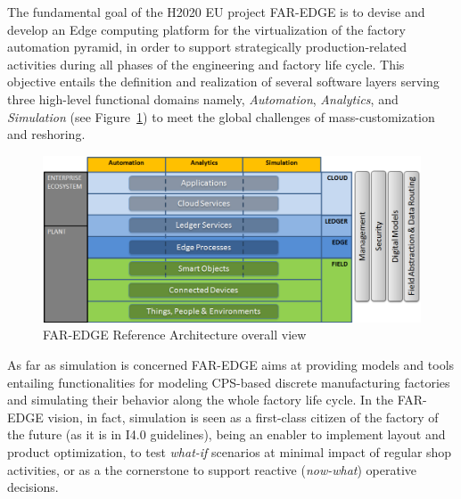 The fundamental goal of the H2020 EU project FAR-EDGE is to devise and develop an Edge computing platform for the virtualization of the factory automation pyramid, in order to support strategically production-related activities during all phases of the engineering and factory life cycle. This objective entails the definition and realization of several software layers serving three high-level functional domains namely, \textit{Automation}, \textit{Analytics}, and \textit{Simulation} (see Figure~\ref{fig:architecture}) to meet the global challenges of mass-customization and reshoring.

\begin{figure}[b]
	\centering
	\includegraphics[width=\linewidth]{images/Far-edge.png}
	\caption{FAR-EDGE Reference Architecture overall view}
	\label{fig:architecture}
\end{figure}

As far as simulation is concerned FAR-EDGE aims at providing models and tools entailing functionalities for modeling CPS-based discrete manufacturing factories and simulating their behavior along the whole factory life cycle. 
In the FAR-EDGE vision, in fact, simulation is seen as a first-class citizen of the factory of the future (as it is in I4.0 guidelines), being an enabler to implement layout and product optimization, to test \textit{what-if} scenarios at minimal impact of regular shop activities, or as a the cornerstone to support reactive (\textit{now-what}) operative decisions. 

